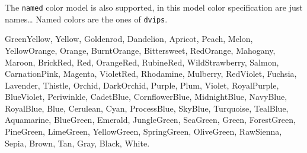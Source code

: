 The \texttt{named} color model is also supported, in this model color
specification are just names\ldots{}
Named colors are the ones of \texttt{dvips}.
\begin{flushleft}
\renewcommand{\textcolor}[3][]{#3}
\textcolor[named]{GreenYellow}{GreenYellow},
\textcolor[named]{Yellow}{Yellow},
\textcolor[named]{Goldenrod}{Goldenrod},
\textcolor[named]{Dandelion}{Dandelion},
\textcolor[named]{Apricot}{Apricot},
\textcolor[named]{Peach}{Peach},
\textcolor[named]{Melon}{Melon},
\textcolor[named]{YellowOrange}{YellowOrange},
\textcolor[named]{Orange}{Orange},
\textcolor[named]{BurntOrange}{BurntOrange},
\textcolor[named]{Bittersweet}{Bittersweet},
\textcolor[named]{RedOrange}{RedOrange},
\textcolor[named]{Mahogany}{Mahogany},
\textcolor[named]{Maroon}{Maroon},
\textcolor[named]{BrickRed}{BrickRed},
\textcolor[named]{Red}{Red},
\textcolor[named]{OrangeRed}{OrangeRed},
\textcolor[named]{RubineRed}{RubineRed},
\textcolor[named]{WildStrawberry}{WildStrawberry},
\textcolor[named]{Salmon}{Salmon},
\textcolor[named]{CarnationPink}{CarnationPink},
\textcolor[named]{Magenta}{Magenta},
\textcolor[named]{VioletRed}{VioletRed},
\textcolor[named]{Rhodamine}{Rhodamine},
\textcolor[named]{Mulberry}{Mulberry},
\textcolor[named]{RedViolet}{RedViolet},
\textcolor[named]{Fuchsia}{Fuchsia},
\textcolor[named]{Lavender}{Lavender},
\textcolor[named]{Thistle}{Thistle},
\textcolor[named]{Orchid}{Orchid},
\textcolor[named]{DarkOrchid}{DarkOrchid},
\textcolor[named]{Purple}{Purple},
\textcolor[named]{Plum}{Plum},
\textcolor[named]{Violet}{Violet},
\textcolor[named]{RoyalPurple}{RoyalPurple},
\textcolor[named]{BlueViolet}{BlueViolet},
\textcolor[named]{Periwinkle}{Periwinkle},
\textcolor[named]{CadetBlue}{CadetBlue},
\textcolor[named]{CornflowerBlue}{CornflowerBlue},
\textcolor[named]{MidnightBlue}{MidnightBlue},
\textcolor[named]{NavyBlue}{NavyBlue},
\textcolor[named]{RoyalBlue}{RoyalBlue},
\textcolor[named]{Blue}{Blue},
\textcolor[named]{Cerulean}{Cerulean},
\textcolor[named]{Cyan}{Cyan},
\textcolor[named]{ProcessBlue}{ProcessBlue},
\textcolor[named]{SkyBlue}{SkyBlue},
\textcolor[named]{Turquoise}{Turquoise},
\textcolor[named]{TealBlue}{TealBlue},
\textcolor[named]{Aquamarine}{Aquamarine},
\textcolor[named]{BlueGreen}{BlueGreen},
\textcolor[named]{Emerald}{Emerald},
\textcolor[named]{JungleGreen}{JungleGreen},
\textcolor[named]{SeaGreen}{SeaGreen},
\textcolor[named]{Green}{Green},
\textcolor[named]{ForestGreen}{ForestGreen},
\textcolor[named]{PineGreen}{PineGreen},
\textcolor[named]{LimeGreen}{LimeGreen},
\textcolor[named]{YellowGreen}{YellowGreen},
\textcolor[named]{SpringGreen}{SpringGreen},
\textcolor[named]{OliveGreen}{OliveGreen},
\textcolor[named]{RawSienna}{RawSienna},
\textcolor[named]{Sepia}{Sepia},
\textcolor[named]{Brown}{Brown},
\textcolor[named]{Tan}{Tan},
\textcolor[named]{Gray}{Gray},
\textcolor[named]{Black}{Black},
\textcolor[named]{White}{White}.
\end{flushleft}

